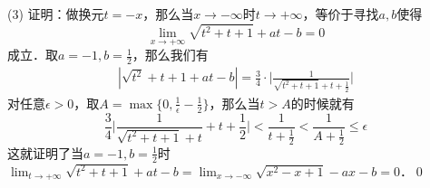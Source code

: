 \noindent (3) 证明：做换元$t=-x$，那么当$x \to -\infty$时$t \to +\infty$，等价于寻找$a,b$使得
\begin{equation}
    \displaystyle\lim_{x \to +\infty}\sqrt{t^2+t+1}+at-b=0
\end{equation}
成立．取$a=-1,b=\displaystyle\frac{1}{2}$，那么我们有
\begin{align}
    |\sqrt{t^2}+t+1+at-b|=\frac{3}{4} \cdot \Bigg\lvert\displaystyle\frac{1}{\displaystyle\sqrt{t^2+t+1}+t+\displaystyle\frac{1}{2}} \Bigg\rvert
\end{align}
对任意$\epsilon>0$，取$A=\max\{0, \displaystyle\frac{1}{\epsilon}-\displaystyle\frac{1}{2}\}$，那么当$t>A$的时候就有
\begin{equation}
    \displaystyle\frac{3}{4}\Bigg\lvert\displaystyle\frac{1}{\sqrt{t^2+t+1}+t}+t+\displaystyle\frac{1}{2}\Bigg\rvert<\frac{1}{t+\displaystyle\frac{1}{2}}<\frac{1}{A+\displaystyle\frac{1}{2}} \leq \epsilon
\end{equation}
这就证明了当$a=-1,b=\displaystyle\frac{1}{2}$时$\displaystyle\lim_{t\to +\infty}\sqrt{t^2+t+1}+at-b=\displaystyle\lim_{x\to -\infty}\sqrt{x^2-x+1}-ax-b=0$．\qed
